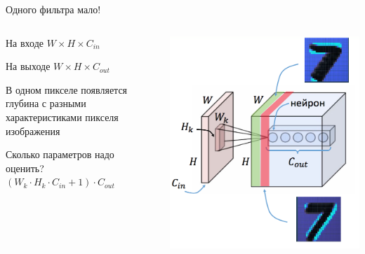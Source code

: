 \documentclass[notes,12pt, aspectratio=169]{beamer}
\newenvironment{wideitemize}{\itemize\addtolength{\itemsep}{10pt}}{\enditemize}
\begin{document}
\begin{frame}{Одного фильтра мало!}
\begin{columns}
	\begin{column}{.49\textwidth}
		\begin{wideitemize} 
			\item На входе $W \times H \times C_{in}$
			\item На выходе $W \times H \times C_{out}$
			\item В одном пикселе появляется глубина с разными характеристиками пикселя изображения
			\item {} {\alert{Сколько параметров надо оценить?}}  \only<2> {$(W_k \cdot H_k \cdot C_{in} + 1) \cdot C_{out}$}
		\end{wideitemize}
	\end{column}
	\begin{column}{.49\textwidth}
		\begin{center}
			\includegraphics[width=.9\linewidth]{convolution3.png}
		\end{center}
	\end{column}
\end{columns}
\end{frame}
\end{document}
